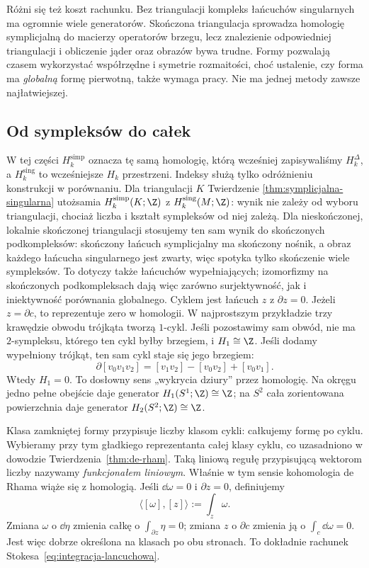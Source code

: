 Różni się też koszt rachunku. Bez triangulacji
kompleks łańcuchów singularnych ma ogromnie
wiele generatorów. Skończona triangulacja
sprowadza homologię symplicjalną do macierzy
operatorów brzegu, lecz znalezienie odpowiedniej
triangulacji i obliczenie jąder oraz obrazów
bywa trudne. Formy pozwalają czasem wykorzystać
współrzędne i symetrie rozmaitości, choć
ustalenie, czy forma ma \emph{globalną}
formę pierwotną, także wymaga pracy.
Nie ma jednej metody zawsze najłatwiejszej.

\subsection*{Od sympleksów do całek}

W tej części $H_k^{\mathrm{simp}}$ oznacza tę samą homologię,
którą wcześniej zapisywaliśmy $H_k^\Delta$, a
$H_k^{\mathrm{sing}}$ to wcześniejsze $H_k$ przestrzeni.
Indeksy służą tylko odróżnieniu konstrukcji w porównaniu.
Dla triangulacji $K$ Twierdzenie
\ref{thm:symplicjalna-singularna} utożsamia
$H_k^{\mathrm{simp}}(K;\Z)$ z
$H_k^{\mathrm{sing}}(M;\Z)$: wynik nie zależy
od wyboru triangulacji, chociaż liczba i kształt
sympleksów od niej zależą. Dla nieskończonej, lokalnie
skończonej triangulacji stosujemy ten sam wynik do skończonych
podkompleksów: skończony łańcuch symplicjalny ma skończony
nośnik, a obraz każdego łańcucha singularnego jest zwarty,
więc spotyka tylko skończenie wiele sympleksów.
To dotyczy także łańcuchów wypełniających; izomorfizmy
na skończonych podkompleksach dają więc zarówno
surjektywność, jak i iniektywność porównania globalnego.
Cyklem jest łańcuch
$z$ z $\partial z=0$. Jeżeli $z=\partial c$,
to reprezentuje zero w homologii.
W najprostszym przykładzie trzy krawędzie
obwodu trójkąta tworzą $1$-cykl. Jeśli
pozostawimy sam obwód, nie ma $2$-sympleksu,
którego ten cykl byłby brzegiem, i
$H_1\cong\Z$. Jeśli dodamy wypełniony trójkąt,
ten sam cykl staje się jego brzegiem:
\[
 \partial[v_0v_1v_2]
 =[v_1v_2]-[v_0v_2]+[v_0v_1].
\]
Wtedy $H_1=0$. To dosłowny sens
„wykrycia dziury” przez homologię.
Na okręgu
jedno pełne obejście daje generator $H_1(S^1;\Z)
\cong\Z$; na $S^2$ cała zorientowana powierzchnia
daje generator $H_2(S^2;\Z)\cong\Z$.

Klasa zamkniętej formy przypisuje liczby
klasom cykli: całkujemy formę po cyklu.
Wybieramy przy tym gładkiego reprezentanta całej klasy
cyklu, co uzasadniono w dowodzie Twierdzenia~\ref{thm:de-rham}.
Taką liniową regułę przypisującą wektorom
liczby nazywamy \emph{funkcjonałem liniowym}.
Właśnie w tym sensie kohomologia de Rhama
wiąże się z homologią. Jeśli
$\dd\omega=0$ i $\partial z=0$, definiujemy
\begin{equation}\label{eq:parowanie-de-rham-homologia}
 \langle[\omega],[z]\rangle:=\int_z\omega.
\end{equation}
Zmiana $\omega$ o $\dd\eta$ zmienia całkę o
$\int_{\partial z}\eta=0$; zmiana $z$ o
$\partial c$ zmienia ją o
$\int_c\dd\omega=0$. Jest więc dobrze określona
na klasach po obu stronach. To dokładnie
rachunek Stokesa~\eqref{eq:integracja-lancuchowa}.

